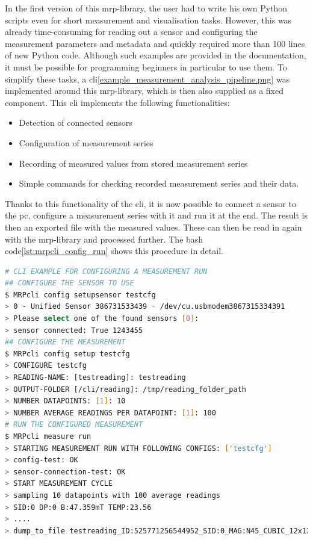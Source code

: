 In the first version of this \gls{mrp}-library, the user had to write
his own Python scripts even for short measurement and visualisation
tasks. However, this was already time-consuming for reading out a sensor
and configuring the measurement parameters and metadata and quickly
required more than 100 lines of new Python code. Although such examples
are provided in the documentation, it must be possible for programming
beginners in particular to use them. To simplify these tasks, a
\gls{cli}\ref{example_measurement_analysis_pipeline.png} was implemented
around this \gls{mrp}-library, which is then also supplied as a fixed
component. This \gls{cli} implements the following functionalities:

\begin{itemize}
\tightlist
\item
  Detection of connected sensors
\item
  Configuration of measurement series
\item
  Recording of measured values from stored measurement series
\item
  Simple commands for checking recorded measurement series and their
  data.
\end{itemize}

Thanks to this functionality of the \gls{cli}, it is now possible to
connect a sensor to the \gls{pc}, configure a measurement series with it
and run it at the end. The result is then an exported file with the
measured values. These can then be read in again with the
\gls{mrp}-library and processed further. The bash
code\ref{lst:mrpcli_config_run} shows this procedure in detail.

\begin{lstlisting}[language=bash, caption={CLI example for configuring a measurement run}, label=lst:mrpcli_config_run]
# CLI EXAMPLE FOR CONFIGURING A MEASUREMENT RUN
## CONFIGURE THE SENSOR TO USE
$ MRPcli config setupsensor testcfg
> 0 - Unified Sensor 386731533439 - /dev/cu.usbmodem3867315334391
> Please select one of the found sensors [0]:
> sensor connected: True 1243455
## CONFIGURE THE MEASUREMENT
$ MRPcli config setup testcfg
> CONFIGURE testcfg
> READING-NAME: [testreading]: testreading
> OUTPUT-FOLDER [/cli/reading]: /tmp/reading_folder_path
> NUMBER DATAPOINTS: [1]: 10
> NUMBER AVERAGE READINGS PER DATAPOINT: [1]: 100
# RUN THE CONFIGURED MEASUREMENT
$ MRPcli measure run
> STARTING MEASUREMENT RUN WITH FOLLOWING CONFIGS: ['testcfg']
> config-test: OK
> sensor-connection-test: OK
> START MEASUREMENT CYCLE
> sampling 10 datapoints with 100 average readings
> SID:0 DP:0 B:47.359mT TEMP:23.56
> ....
> dump_to_file testreading_ID:525771256544952_SID:0_MAG:N45_CUBIC_12x12x12.mag.json
\end{lstlisting}

